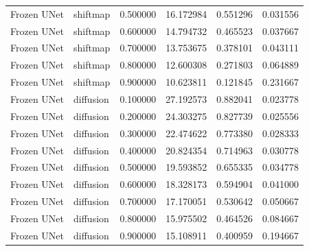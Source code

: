 \begin{table}[h]
\begin{tabular}{llrrrr}
Frozen UNet & shiftmap & 0.500000 & 16.172984 & 0.551296 & 0.031556 \\
Frozen UNet & shiftmap & 0.600000 & 14.794732 & 0.465523 & 0.037667 \\
Frozen UNet & shiftmap & 0.700000 & 13.753675 & 0.378101 & 0.043111 \\
Frozen UNet & shiftmap & 0.800000 & 12.600308 & 0.271803 & 0.064889 \\
Frozen UNet & shiftmap & 0.900000 & 10.623811 & 0.121845 & 0.231667 \\
Frozen UNet & diffusion & 0.100000 & 27.192573 & 0.882041 & 0.023778 \\
Frozen UNet & diffusion & 0.200000 & 24.303275 & 0.827739 & 0.025556 \\
Frozen UNet & diffusion & 0.300000 & 22.474622 & 0.773380 & 0.028333 \\
Frozen UNet & diffusion & 0.400000 & 20.824354 & 0.714963 & 0.030778 \\
Frozen UNet & diffusion & 0.500000 & 19.593852 & 0.655335 & 0.034778 \\
Frozen UNet & diffusion & 0.600000 & 18.328173 & 0.594904 & 0.041000 \\
Frozen UNet & diffusion & 0.700000 & 17.170051 & 0.530642 & 0.050667 \\
Frozen UNet & diffusion & 0.800000 & 15.975502 & 0.464526 & 0.084667 \\
Frozen UNet & diffusion & 0.900000 & 15.108911 & 0.400959 & 0.194667 \\
\bottomrule
\end{tabular}


\end{table}
